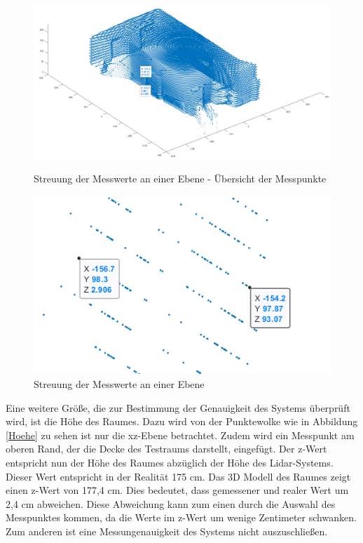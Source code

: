 \begin{figure}[htb]
	\centering
	\begin{minipage}[t]{0.45\linewidth}
		\centering
		\includegraphics[width=1.2\linewidth]{images/Validierung/Genauigkeit/wandbreite_alles.png}
		\caption{Streuung der Messwerte an einer Ebene - Übersicht der Messpunkte}
		\label{wandbreite_alles}
	\end{minipage}
	\hfill
	\begin{minipage}[t]{0.45\linewidth}
		\centering
		\includegraphics[width=1.2\linewidth]{images/Validierung/Genauigkeit/wandbreite.png}
		\caption{Streuung der Messwerte an einer Ebene}
		\label{wandbreite_label}
	\end{minipage}
\end{figure}


Eine weitere Größe, die zur Bestimmung der Genauigkeit des Systems überprüft wird, ist die Höhe des Raumes. Dazu wird von der Punktewolke wie in Abbildung \ref{Hoehe} zu sehen ist nur die xz-Ebene betrachtet. Zudem wird ein Messpunkt am oberen Rand, der die Decke des Testraums darstellt, eingefügt. Der z-Wert entspricht nun der Höhe des Raumes abzüglich der Höhe des Lidar-Systems. Dieser Wert entspricht in der Realität 175 cm. Das 3D Modell des Raumes zeigt einen z-Wert von 177,4 cm. Dies bedeutet, dass gemessener und realer Wert um 2,4 cm abweichen.
Diese Abweichung kann zum einen durch die Auswahl des Messpunktes kommen, da die Werte im z-Wert um wenige Zentimeter schwanken. Zum anderen ist eine Messungenauigkeit des Systems nicht auszuschließen.
 

